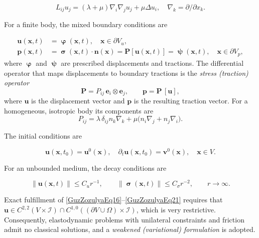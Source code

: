 \begin{equation}\label{GuzZozulyaEq17} %
	L_{ij}u_{j}=(\lambda+\mu)\nabla_{i}\nabla_{j}u_{j}+\mu \Delta u_{i},\quad \nabla_{k}=\partial/\partial x_{k}.
\end{equation}

For a finite body, the mixed boundary conditions are

\begin{equation}\label{GuzZozulyaEq18} %
	\begin{aligned}
		\mathbf{u}(\mathbf{x},t)&=\bm{\upvarphi}(\mathbf{x},t),\quad \mathbf{x}\in\partial V_{u},
		\\
		\mathbf{p}(\mathbf{x},t)&=\bm{\upsigma}(\mathbf{x},t) \!\cdot\! \mathbf{n}(\mathbf{x})
		=\mathbf{P}[\mathbf{u}(\mathbf{x},t)]=\bm{\uppsi}(\mathbf{x},t),\quad \mathbf{x}\in\partial V_{p},
	\end{aligned}
\end{equation}
where $\bm{\upvarphi}$ and $\bm{\uppsi}$ are prescribed displacements and tractions. The differential operator that maps displacements to boundary tractions is the \emph{stress (traction) operator}
\[
\mathbf{P}=P_{ij}\,\mathbf{e}_{i}\otimes\mathbf{e}_{j},
\qquad
\mathbf{p}=\mathbf{P}\,[\mathbf{u}],
\]
where $\mathbf{u}$ is the displacement vector and $\mathbf{p}$ is the resulting traction vector.
For a homogeneous, isotropic body its components are
\begin{equation}\label{GuzZozulyaEq19}%
	P_{ij}= \lambda\,\delta_{ij} n_{k}\nabla_{k}
	+ \mu\bigl(n_{i}\nabla_{j}+n_{j}\nabla_{i}\bigr).
\end{equation}
 
The initial conditions are

\begin{equation}\label{GuzZozulyaEq20} %
	\mathbf{u}(\mathbf{x},t_{0})=\mathbf{u}^{0}(\mathbf{x}),\quad
	\partial_{t}\mathbf{u}(\mathbf{x},t_{0})=\mathbf{v}^{0}(\mathbf{x}),\quad
	\mathbf{x}\in V.
\end{equation}

For an unbounded medium, the decay conditions are

\begin{equation}\label{GuzZozulyaEq21} %
	\|\mathbf{u}(\mathbf{x},t)\|\le C_{u}r^{-1},\qquad
	\|\bm{\upsigma}(\mathbf{x},t)\|\le C_{\sigma}r^{-2},\qquad
	r\to\infty.
\end{equation}

Exact fulfillment of \eqref{GuzZozulyaEq16}--\eqref{GuzZozulyaEq21} requires that  
$\mathbf{u}\in C^{2,2}(V\times\mathcal{I})\cap C^{1,0}((\partial V\cup\Omega)\times\mathcal{I})$,  
which is very restrictive.  
Consequently, elastodynamic problems with unilateral constraints and friction admit no classical solutions,  
and a \emph{weakened (variational) formulation} is adopted.


